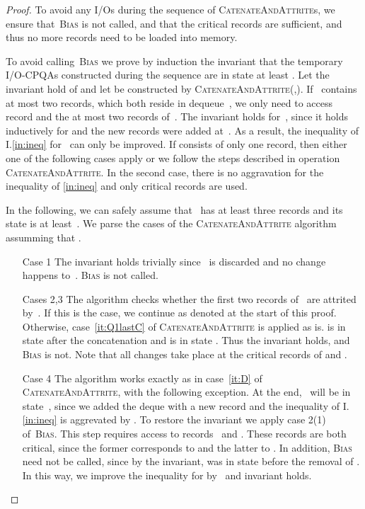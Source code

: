 \documentclass[]{article}
\newcommand{\iref}[1]{I.\ref{#1}}
\begin{document}
\begin{fullenv}
\begin{proof}
  To avoid any I/Os during the sequence of \textsc{CatenateAndAttrite}s, we
  ensure that~\textsc{Bias} is not called, and that the critical records are
  sufficient, and thus no more records need to be loaded into memory.

  To avoid calling~\textsc{Bias} we prove by induction the invariant that the
  temporary I/O-CPQAs  constructed during the sequence are
  in state at least . Let the invariant hold of  and let 
  be constructed by \textsc{CatenateAndAttrite}(,). If~
  contains at most two records, which both reside in dequeue~, we only
  need to access record  and the at most two records
  of~. The invariant holds for~, since it holds inductively for
   and the new records were added at~. As a result, the
  inequality of \iref{in:ineq} for~ can only be improved. If 
  consists of only one record, then either one of the following cases apply or
  we follow the steps described in operation \textsc{CatenateAndAttrite}. In the
  second case, there is no aggravation for the inequality of \ref{in:ineq} and
  only critical records are used.

  In the following, we can safely assume that~ has at least three records
  and its state is at least~. We parse the cases of the
  \textsc{CatenateAndAttrite} algorithm assumming that .
  \begin{itemize}
    \item[Case 1] {The invariant holds trivially since~ is discarded and no
      change happens to~.  \textsc{Bias} is not called.}

    \item[Cases 2,3] {The algorithm checks whether the first two records
        of~ are attrited by~. If this is the case, we continue as
        denoted at the start of this proof. Otherwise, case~\ref{it:Q1lastC} of
        \textsc{CatenateAndAttrite} is applied as is.  is in state 
        after the concatenation and  is in state . Thus the invariant
        holds, and \textsc{Bias} is not. Note that all changes take place at the
        critical records of  and .}

    \item[Case 4] {The algorithm works exactly as in case~\ref{it:D} of
        \textsc{CatenateAndAttrite}, with the following exception. At the
        end,~ will be in state~, since we added the deque
         with a new record and the inequality of
        \iref{in:ineq} is aggrevated by . To restore the invariant we apply
        case 2(1) of~\textsc{Bias}. This step requires access to records~ and . These records are both
        critical, since the former corresponds to  and
        the latter to . In addition, \textsc{Bias}
        need not be called, since by the invariant,  was in state 
      before the removal of . In this way, we improve the
    inequality for  by~ and invariant holds.}
  \end{itemize}
\end{proof}
\end{fullenv}
\end{document}
